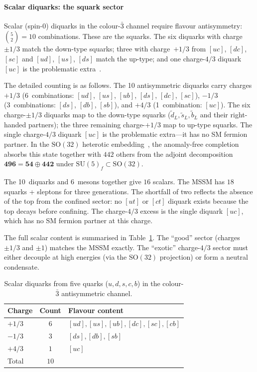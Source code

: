 \documentclass[aps,prd,twocolumn,showpacs,preprintnumbers,superscriptaddress]{revtex4-2}
\newcommand{\SU}{\mathrm{SU}}
\newcommand{\SO}{\mathrm{SO}}
\begin{document}
\paragraph{Scalar diquarks: the squark sector}

Scalar (spin-0) diquarks in the colour-$\bar 3$ channel
require flavour antisymmetry:
$\binom{5}{2} = 10$ combinations.
These are the squarks.
The six diquarks with charge $\pm 1/3$ match the
down-type squarks; three with charge~$+1/3$ from $[uc]$,
$[dc]$, $[sc]$ and $[ud]$, $[us]$, $[ds]$ match the
up-type; and one charge-$4/3$ diquark $[uc]$ is the
problematic extra~\cite{Rivero:2024}.

The detailed counting is as follows.
The 10 antisymmetric diquarks
carry charges $+1/3$ (6~combinations: $[ud]$, $[us]$, $[ub]$,
$[ds]$, $[dc]$, $[sc]$), $-1/3$ (3~combinations: $[ds]$,
$[db]$, $[sb]$), and $+4/3$ (1~combination: $[uc]$).
The six charge-$\pm 1/3$ diquarks map to the down-type
squarks ($\tilde d_L, \tilde s_L, \tilde b_L$ and their
right-handed partners); the three remaining charge-$+1/3$
map to up-type squarks.
The single charge-$4/3$ diquark $[uc]$ is the problematic
extra---it has no SM fermion partner.
In the $\SO(32)$ heterotic embedding~\cite{Rivero:2024},
the anomaly-free completion absorbs this state together
with $442$ others from the adjoint decomposition
$\mathbf{496} = \mathbf{54} \oplus \mathbf{442}$
under $\SU(5)_f \subset \SO(32)$.

The 10~diquarks and 6~mesons together give $16$ scalars.
The MSSM has $18$ squarks + sleptons for three generations.
The shortfall of two reflects the absence of the top from
the confined sector: no $[ut]$ or $[ct]$ diquark exists
because the top decays before confining.
The charge-$4/3$ excess is the single diquark $[uc]$,
which has no SM fermion partner at this charge.

The full scalar content is summarised in Table~\ref{tab:scalars}.
The ``good'' sector (charges $\pm 1/3$ and $\pm 1$) matches
the MSSM exactly.
The ``exotic'' charge-$4/3$ sector must either decouple at
high energies (via the $\SO(32)$ projection) or form a
neutral condensate.

\begin{table}[h]
\centering
\caption{Scalar diquarks from five quarks ($u,d,s,c,b$)
  in the colour-$\bar 3$ antisymmetric channel.}
\label{tab:scalars}
\begin{tabular}{lcl}
\toprule
Charge & Count & Flavour content \\
\midrule
$+1/3$ & $6$ & $[ud],[us],[ub],[dc],[sc],[cb]$ \\
$-1/3$ & $3$ & $[ds],[db],[sb]$ \\
$+4/3$ & $1$ & $[uc]$ \\
\midrule
Total & $10$ & \\
\bottomrule
\end{tabular}
\end{table}
\end{document}
